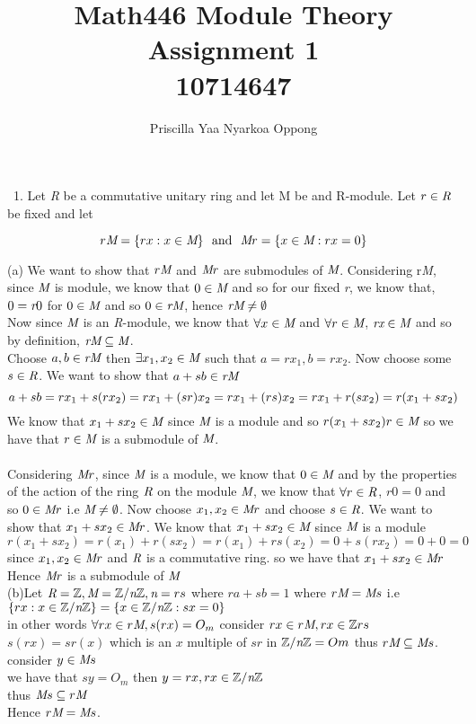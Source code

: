 \documentclass{article}
\author{Priscilla Yaa Nyarkoa Oppong}
\date{}
\title{%
    Math446 Module Theory\\
    Assignment 1\\
    10714647}
\begin{document}
\maketitle
\noindent\ 
1. Let \emph{R} be a commutative unitary ring and let M be and R-module. Let $ r\in\emph{R}$
be fixed and let 


\[r\emph{M} = \{rx:x\in\emph{M}\}\ \ \textrm{and}\ \ \emph{M}r =\{x\in\emph{M}:rx = 0\}\]

(a) We want to show that  $r\emph{M}$ and $\emph{M}r$ are submodules of $\emph{M}$.
Considering r\emph{M}, since $\emph{M}$ is module, we know that $0\in\emph{M}$ and so 
for our fixed \emph{r}, we know that, $0 = \emph{r}0$ 
for $0\in\emph{M}$ and so  $0\in\emph{rM}$, hence  $\emph{rM}\ne\emptyset$\\
Now since $\emph{M}$ is an \emph{R}-module, we know that $\forall{x}\in\emph{M}$ and 
$\forall{r}\in\emph{M}$, $\emph{rx}\in\emph{M}$ and so by definition, $\emph{rM} \subseteq\emph{M}$. 
\\Choose $a, b\in\emph{rM}$ then $\exists{x}_1, x_2\in\emph{M}$ such that $a = rx_1, b = rx_2$.
Now choose some $s\in\emph{R}$. 
We want to show that $a + sb\in\emph{rM}$ \\

$$a+sb = rx_1 + s(rx_2) = rx_1 + (sr)x_2 = rx_1 + (rs)x_2 = rx_1 + r(sx_2)=\\
r(x_1 + sx_2)$$
We know that $x_1 + sx_2\in\emph{M}$ since $\emph{M}$ is a module and so 
$r(x_1 + sx_2)r\in\emph{M}$ so we have
that $r\in\emph{M}$ is a submodule of $\emph{M}$.\\
\\
Considering $\emph{M}r$, since $\emph{M}$ is a module, we know that $0\in\emph{M}$ 
and by the properties of 
the action of the ring $\emph{R}$ on the module $\emph{M}$, we know that 
$\forall{r}\in\emph{R}$, 
$r0 = 0$ and 
so $0\in\emph{M}r$
i.e $\emph{M}\ne\emptyset$. Now choose $x_1, x_2\in\emph{M}r$ and choose $s\in\emph{R}$. 
We want to show that 
$x_1 + sx_2\in\emph{M}r$. We know that $x_1 + sx_2\in\emph{M}$ since $\emph{M}$ is a module
$r(x_1 + sx_2) = r(x_1) + r(sx_2) = r(x_1) + rs(x_2) = 0 + s(rx_2) = 0 + 0 = 0$ 
since $ x_1, x_2\in\emph{M}r$ and 
$\emph{R}$ is a commutative ring. so we have that
$x_1 + sx_2\in\emph{M}r$ Hence $\emph{M}r$ is a  submodule of $\emph{M}$\\
(b)Let 
$\emph{R} = \mathbb{Z}, \emph{M} = \mathbb{Z}/\emph{n}\mathbb{Z}, \emph{n} = rs$
where $ra + sb = 1$ 
where $r\emph{M} = \emph{M}s$ 
i.e $\{rx : x\in\mathbb{Z}/\emph{n}\mathbb{Z}\} = \{x\in\mathbb{Z}/\emph{n}\mathbb{Z}: sx = 0\}$
\\
in other words $\forall{rx}\in{r}\emph{M}, s(rx) = O_m$ 
consider $rx\in{r}\emph{M}, rx\in\mathbb{Z}rs$
$s(rx) = sr(x)$ which is an $x$ multiple of $sr$ in $\mathbb{Z}/\emph{n}\mathbb{Z} = Om$
thus $r\emph{M}\subseteq\emph{M}s$. consider $y\in\emph{M}s$\\
we have that $sy = O_m$ then $y = rx, rx\in\mathbb{Z}/\emph{n}\mathbb{Z}$
\\
thus $\emph{M}s\subseteq{r}\emph{M}$\\
Hence $r\emph{M} = \emph{M}s$.
\end{document}
